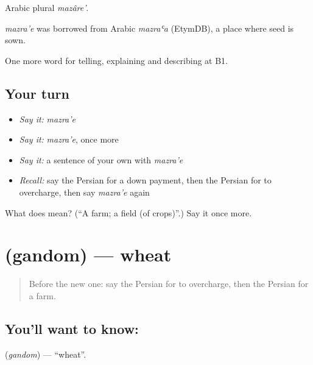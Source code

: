 Arabic plural \emph{mazâre'}.

\begin{cousinweb}
\emph{mazra'e} was borrowed from Arabic \emph{mazraʿa} (EtymDB), a place where seed is sown.
\end{cousinweb}

\begin{grammarlens}[title={What you've built}]
One more word for telling, explaining and describing at B1.
\end{grammarlens}

\subsection*{Your turn}
\begin{itemize}
\raggedright
  \item \emph{Say it:} \emph{mazra'e}
  \item \emph{Say it:} \emph{mazra'e}, once more
  \item \emph{Say it:} a sentence of your own with \emph{mazra'e}
  \item \emph{Recall:} say the Persian for a down payment, then the Persian for to overcharge, then say \emph{mazra'e} again
\end{itemize}

\begin{tcolorbox}[breakable,colback=teal!4,colframe=teal!35!black,title={Before you move on}]
What does  mean? (\textquotedblleft{}A farm; a field (of crops)\textquotedblright{}.) Say it once more.
\end{tcolorbox}
\section[\texorpdfstring{\fa{گندم} (gandom)}{گندم (gandom)}]{ (gandom) — wheat}

\label{lesson:FA-C465-gandom}



\begin{quote}
Before the new one: say the Persian for to overcharge, then the Persian for a farm.
\end{quote}

\subsection*{You'll want to know: }
\textbf{} (\emph{gandom}) — \textquotedblleft{}wheat\textquotedblright{}.

